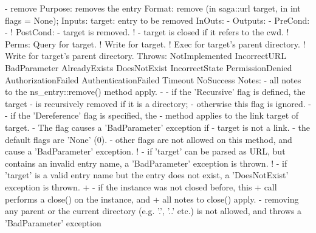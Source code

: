 \begin{myspec}
 
    - remove
      Purpose:  removes the entry
      Format:   remove             (in  saga::url  target,
                                    in  int     flags = None);
      Inputs:   target:             entry to be removed
      InOuts:   -
      Outputs:  -
      PreCond:  -
!     PostCond: - target is removed.
!               - target is closed if it refers to the cwd.
!     Perms:    Query for target.
!               Write for target.
!               Exec  for target's parent directory.
!               Write for target's parent directory.
      Throws:   NotImplemented
                IncorrectURL
                BadParameter
                AlreadyExists
                DoesNotExist
                IncorrectState
                PermissionDenied
                AuthorizationFailed
                AuthenticationFailed
                Timeout
                NoSuccess
      Notes:    - all notes to the ns_entry::remove() method
                  apply.
-               - if the 'Recursive' flag is defined, the target
-                 is recursively removed if it is a directory;
-                 otherwise this flag is ignored.
-               - if the 'Dereference' flag is specified, the
-                 method applies to the link target of target.
-                 The flag causes a 'BadParameter' exception if
-                 target is not a link.
                - the default flags are 'None' (0).
                - other flags are not allowed on this method, 
                  and cause a 'BadParameter' exception.
!               - if 'target' can be parsed as URL, but contains 
                  an invalid entry name, a 'BadParameter'
                  exception is thrown.
!               - if 'target' is a valid entry name but the entry
                  does not exist, a 'DoesNotExist' exception is
                  thrown.
+               - if the instance was not closed before, this
+                 call performs a close() on the instance, and 
+                 all notes to close() apply.
                - removing any parent or the current directory 
                  (e.g.  '.', '..' etc.) is not allowed, and 
                  throws a 'BadParameter' exception
 

\end{myspec}
